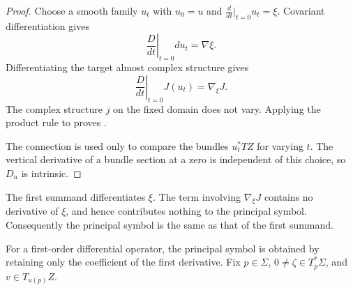 \begin{proof}
  Choose a smooth family $u_t$ with $u_0=u$ and
  $\frac{d}{dt}|_{t=0}u_t=\xi$. Covariant differentiation gives
  \[
    \left.\frac{D}{dt}\right|_{t=0}du_t=\nabla\xi.
  \]
  Differentiating the target almost complex structure gives
  \[
    \left.\frac{D}{dt}\right|_{t=0}J(u_t)=\nabla_\xi J.
  \]
  The complex structure $j$ on the fixed domain does not vary. Applying the
  product rule to
   proves
  .

  The connection is used only to compare the bundles $u_t^*TZ$ for varying
  $t$. The vertical derivative of a bundle section at a zero is independent
  of this choice, so $D_u$ is intrinsic.
\end{proof}

The first summand differentiates $\xi$. The term involving $\nabla_\xi J$
contains no derivative of $\xi$, and hence contributes nothing to the
principal symbol. Consequently the principal symbol is the same as that of the first summand.

For a first-order differential operator, the principal symbol is obtained by
retaining only the coefficient of the first derivative. Fix $p\in\Sigma$,
$0\neq\zeta\in T_p^*\Sigma$, and $v\in T_{u(p)}Z$.



